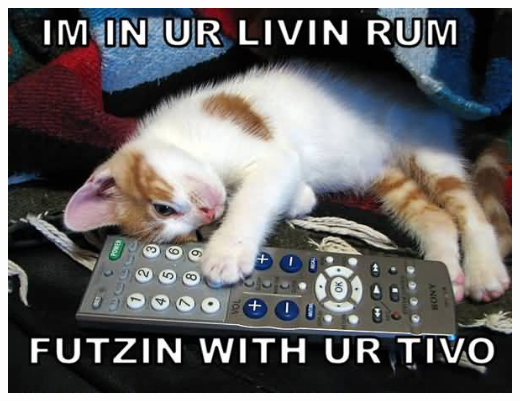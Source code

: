\documentclass[ddc nogerman]{tudbeamer}
\begin{document}
\begin{frame}
    \includegraphics[height=\textheight]{img/endcat.jpg}
\end{frame}
\end{document}
